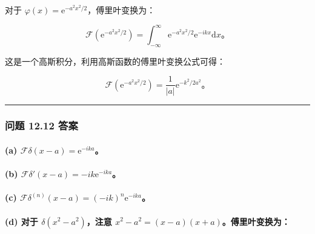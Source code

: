 对于 $\varphi(x) = \mathrm{e}^{-a^2 x^2 / 2}$，傅里叶变换为：

$$
\mathcal{F}\left(\mathrm{e}^{-a^2 x^2 / 2}\right) = \int_{-\infty}^\infty \mathrm{e}^{-a^2 x^2 / 2} \mathrm{e}^{-i k x} \mathrm{d}x。
$$

这是一个高斯积分，利用高斯函数的傅里叶变换公式可得：

$$
\mathcal{F}\left(\mathrm{e}^{-a^2 x^2 / 2}\right) = \frac{1}{|a|} \mathrm{e}^{-k^2 / 2a^2}。
$$

\begin{center}\rule{0.5\linewidth}{0.5pt}\end{center}

\subsubsection{问题 12.12 答案}\label{ux95eeux9898-12.12-ux7b54ux6848}

\paragraph{\texorpdfstring{(a)
$\mathcal{F}\delta(x-a) = \mathrm{e}^{-i k a}$。}{(a) \textbackslash mathcal\{F\}\textbackslash delta(x-a) = \textbackslash mathrm\{e\}\^{}\{-i k a\}。}}\label{a-mathcalfdeltax-a-mathrme-i-k-a}

\paragraph{\texorpdfstring{(b)
$\mathcal{F}\delta'(x-a) = -i k \mathrm{e}^{-i k a}$。}{(b) \textbackslash mathcal\{F\}\textbackslash delta\textegsingle(x-a) = -i k \textbackslash mathrm\{e\}\^{}\{-i k a\}。}}\label{b-mathcalfdeltax-a--i-k-mathrme-i-k-a}

\paragraph{\texorpdfstring{(c)
$\mathcal{F}\delta^{(n)}(x-a) = (-i k)^n \mathrm{e}^{-i k a}$。}{(c) \textbackslash mathcal\{F\}\textbackslash delta\^{}\{(n)\}(x-a) = (-i k)\^{}n \textbackslash mathrm\{e\}\^{}\{-i k a\}。}}\label{c-mathcalfdeltanx-a--i-kn-mathrme-i-k-a}

\paragraph{\texorpdfstring{(d) 对于 $\delta(x^2-a^2)$，注意
$x^2-a^2 = (x-a)(x+a)$。傅里叶变换为：}{(d) 对于 \textbackslash delta(x\^{}2-a\^{}2)，注意 x\^{}2-a\^{}2 = (x-a)(x+a)。傅里叶变换为：}}\label{d-ux5bf9ux4e8e-deltax2-a2ux6ce8ux610f-x2-a2-x-axaux5085ux91ccux53f6ux53d8ux6362ux4e3a}

